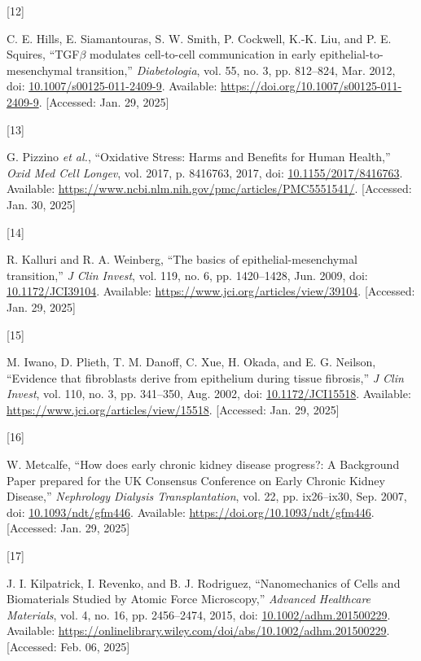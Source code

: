 \documentclass[
  paper=a4,
  ,captions=tableheading
]{scrartcl}
\newlength{\cslhangindent}
\newlength{\csllabelwidth}
\newenvironment{CSLReferences}[2] %
  {\begin{list}{}{%
   \setlength{\itemindent}{0pt}
   \setlength{\leftmargin}{0pt}
   \setlength{\parsep}{0pt}
   \ifodd #1
    \setlength{\leftmargin}{\cslhangindent}
    \setlength{\itemindent}{-1\cslhangindent}
   \fi
   \setlength{\itemsep}{#2\baselineskip}}}
  {\end{list}}
\newcommand{\CSLLeftMargin}[1]{\parbox[t]{\csllabelwidth}{\strut#1\strut}}
\newcommand{\CSLRightInline}[1]{\parbox[t]{\linewidth - \csllabelwidth}{\strut#1\strut}}
\begin{document}
\begin{CSLReferences}{0}{0}
\CSLLeftMargin{{[}12{]} }%
\CSLRightInline{C. E. Hills, E. Siamantouras, S. W. Smith, P. Cockwell,
K.-K. Liu, and P. E. Squires, {``{TGF\(\beta\)} modulates cell-to-cell
communication in early epithelial-to-mesenchymal transition,''}
\emph{Diabetologia}, vol. 55, no. 3, pp. 812--824, Mar. 2012, doi:
\href{https://doi.org/10.1007/s00125-011-2409-9}{10.1007/s00125-011-2409-9}.
Available: \url{https://doi.org/10.1007/s00125-011-2409-9}. {[}Accessed:
Jan. 29, 2025{]}}

\CSLLeftMargin{{[}13{]} }%
\CSLRightInline{G. Pizzino \emph{et al.}, {``Oxidative {Stress}: {Harms}
and {Benefits} for {Human Health},''} \emph{Oxid Med Cell Longev}, vol.
2017, p. 8416763, 2017, doi:
\href{https://doi.org/10.1155/2017/8416763}{10.1155/2017/8416763}.
Available: \url{https://www.ncbi.nlm.nih.gov/pmc/articles/PMC5551541/}.
{[}Accessed: Jan. 30, 2025{]}}

\CSLLeftMargin{{[}14{]} }%
\CSLRightInline{R. Kalluri and R. A. Weinberg, {``The basics of
epithelial-mesenchymal transition,''} \emph{J Clin Invest}, vol. 119,
no. 6, pp. 1420--1428, Jun. 2009, doi:
\href{https://doi.org/10.1172/JCI39104}{10.1172/JCI39104}. Available:
\url{https://www.jci.org/articles/view/39104}. {[}Accessed: Jan. 29,
2025{]}}

\CSLLeftMargin{{[}15{]} }%
\CSLRightInline{M. Iwano, D. Plieth, T. M. Danoff, C. Xue, H. Okada, and
E. G. Neilson, {``Evidence that fibroblasts derive from epithelium
during tissue fibrosis,''} \emph{J Clin Invest}, vol. 110, no. 3, pp.
341--350, Aug. 2002, doi:
\href{https://doi.org/10.1172/JCI15518}{10.1172/JCI15518}. Available:
\url{https://www.jci.org/articles/view/15518}. {[}Accessed: Jan. 29,
2025{]}}

\CSLLeftMargin{{[}16{]} }%
\CSLRightInline{W. Metcalfe, {``How does early chronic kidney disease
progress?: {A Background Paper} prepared for the {UK Consensus
Conference} on {Early Chronic Kidney Disease},''} \emph{Nephrology
Dialysis Transplantation}, vol. 22, pp. ix26--ix30, Sep. 2007, doi:
\href{https://doi.org/10.1093/ndt/gfm446}{10.1093/ndt/gfm446}.
Available: \url{https://doi.org/10.1093/ndt/gfm446}. {[}Accessed: Jan.
29, 2025{]}}

\CSLLeftMargin{{[}17{]} }%
\CSLRightInline{J. I. Kilpatrick, I. Revenko, and B. J. Rodriguez,
{``Nanomechanics of {Cells} and {Biomaterials Studied} by {Atomic Force
Microscopy},''} \emph{Advanced Healthcare Materials}, vol. 4, no. 16,
pp. 2456--2474, 2015, doi:
\href{https://doi.org/10.1002/adhm.201500229}{10.1002/adhm.201500229}.
Available:
\url{https://onlinelibrary.wiley.com/doi/abs/10.1002/adhm.201500229}.
{[}Accessed: Feb. 06, 2025{]}}


\end{CSLReferences}
\end{document}
